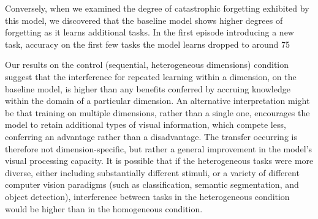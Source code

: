 Conversely, when we examined the degree of catastrophic forgetting exhibited by this model, we discovered that the baseline model shows higher degrees of forgetting as it learns additional tasks. In the first episode introducing a new task, accuracy on the first few tasks the model learns dropped to around 75%

Our results on the control (sequential, heterogeneous dimensions) condition suggest that the interference for repeated learning within a dimension, on the baseline model, is higher than any benefits conferred by accruing knowledge within the domain of a particular dimension. An alternative interpretation might be that training on multiple dimensions, rather than a single one, encourages the model to retain additional types of visual information, which compete less, conferring an advantage rather than a disadvantage. The transfer occurring is therefore not dimension-specific, but rather a general improvement in the model’s visual processing capacity. It is possible that if the heterogeneous tasks were more diverse, either including substantially different stimuli, or a variety of different computer vision paradigms (such as classification, semantic segmentation, and object detection), interference between tasks in the heterogeneous condition would be higher than in the homogeneous condition.

